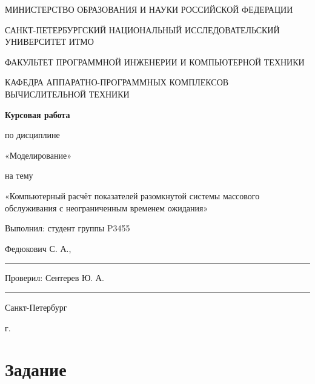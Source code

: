 \documentclass[14pt]{extarticle}
\begin{document}
    \thispagestyle{empty}
    \begin{center}
        МИНИСТЕРСТВО ОБРАЗОВАНИЯ И НАУКИ РОССИЙСКОЙ ФЕДЕРАЦИИ

        САНКТ-ПЕТЕРБУРГСКИЙ НАЦИОНАЛЬНЫЙ ИССЛЕДОВАТЕЛЬСКИЙ УНИВЕРСИТЕТ ИТМО

        ФАКУЛЬТЕТ ПРОГРАММНОЙ ИНЖЕНЕРИИ И КОМПЬЮТЕРНОЙ ТЕХНИКИ

        КАФЕДРА АППАРАТНО-ПРОГРАММНЫХ КОМПЛЕКСОВ ВЫЧИСЛИТЕЛЬНОЙ ТЕХНИКИ

        \vspace{2cm}

        \textbf{Курсовая работа}

        по дисциплине

        «Моделирование»

        на тему

        «Компьютерный расчёт показателей разомкнутой системы массового обслуживания с неограниченным временем ожидания»

        \vspace{2cm}

        \begin{flushright}
            Выполнил: студент группы P3455

            Федюкович С. А.,\par
            \rule[0.66\baselineskip]{3cm}{0.4pt}

            \par

            Проверил: Сентерев Ю. А.

            \par\par

            \rule[0.66\baselineskip]{3cm}{0.4pt}
        \end{flushright}

        \vspace*{\fill}

        Санкт-Петербург

        \the\year г.
    \end{center}

    \newpage
    \restoregeometry
    \pagestyle{plain}
    \setcounter{page}{1}

    \tableofcontents

    \newpage

    \section*{Задание}
\end{document}
